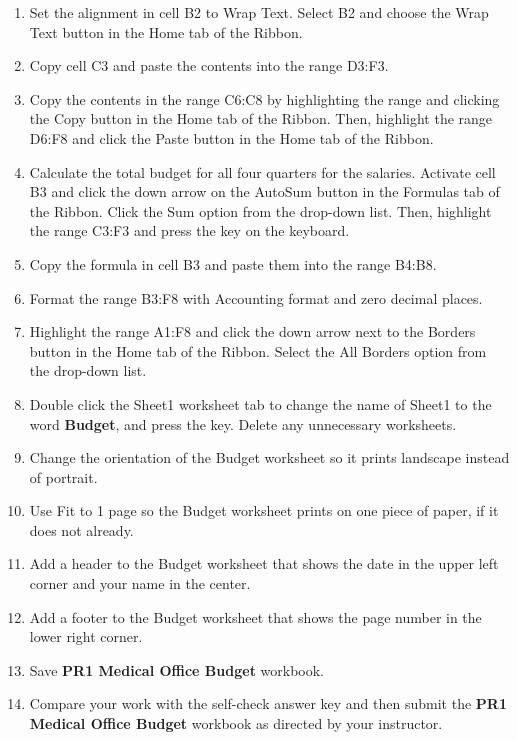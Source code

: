 \begin{enumerate}[resume]
	\item Set the alignment in cell \textsf{B2} to Wrap Text. Select \textsf{B2} and choose the Wrap Text button in the Home tab of the Ribbon.
	\item Copy cell \textsf{C3} and paste the contents into the range \textsf{D3:F3}.
	\item Copy the contents in the range \textsf{C6:C8} by highlighting the range and clicking the Copy button in the Home tab of the Ribbon. Then, highlight the range \textsf{D6:F8} and click the Paste button in the Home tab of the Ribbon.
	\item Calculate the total budget for all four quarters for the salaries. Activate cell \textsf{B3} and click the down arrow on the AutoSum button in the Formulas tab of the Ribbon. Click the Sum option from the drop-down list. Then, highlight the range \textsf{C3:F3} and press the  key on the keyboard.
	\item Copy the formula in cell \textsf{B3} and paste them into the range \textsf{B4:B8}.
	\item Format the range \textsf{B3:F8} with Accounting format and zero decimal places.
	\item Highlight the range \textsf{A1:F8} and click the down arrow next to the Borders button in the Home tab of the Ribbon. Select the All Borders option from the drop-down list.
	\item Double click the Sheet1 worksheet tab to change the name of Sheet1 to the word \textbf{Budget}, and press the  key. Delete any unnecessary worksheets.
	\item Change the orientation of the Budget worksheet so it prints landscape instead of portrait.
	\item Use Fit to 1 page so the Budget worksheet prints on one piece of paper, if it does not already.
	\item Add a header to the Budget worksheet that shows the date in the upper left corner and your name in the center.
	\item Add a footer to the Budget worksheet that shows the page number in the lower right corner. 
	\item Save \textbf{PR1 Medical Office Budget} workbook.
	\item Compare your work with the self-check answer key and then submit the \textbf{PR1 Medical Office Budget} workbook as directed by your instructor.
\end{enumerate}

